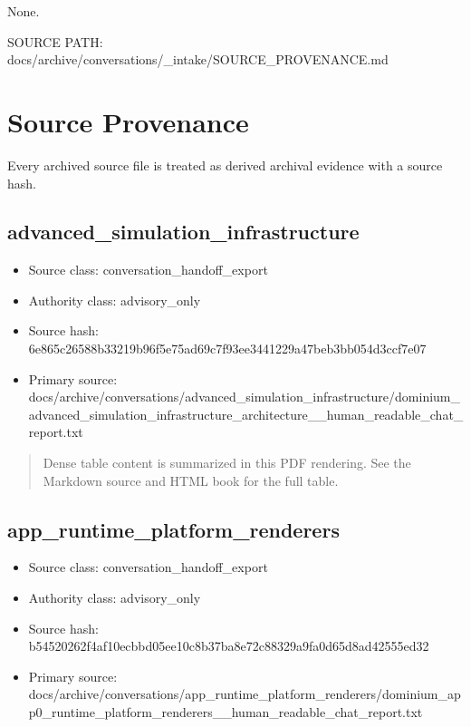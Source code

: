\documentclass[11pt,a4paper]{report}
\begin{document}
None.




{\small\raggedright SOURCE PATH: docs/\allowbreak{}archive/\allowbreak{}conversations/\allowbreak{}\_\allowbreak{}intake/\allowbreak{}SOURCE\_\allowbreak{}PROVENANCE.md\par}


\section{Source Provenance}

Every archived source file is treated as derived archival evidence with a source hash.


\subsection{advanced\_simulation\_infrastructure}

\begin{itemize}
\item Source class: conversation\_handoff\_export
\item Authority class: advisory\_only
\item Source hash: 6e865c26588b33219b96f5e75ad69c7f93ee3441229a47beb3bb054d3ccf7e07
\item Primary source: docs/archive/conversations/advanced\_simulation\_infrastructure/dominium\_advanced\_simulation\_infrastructure\_architecture\_\_human\_readable\_chat\_report.txt
\end{itemize}

\begin{quote}\small Dense table content is summarized in this PDF rendering. See the Markdown source and HTML book for the full table.\end{quote}

\subsection{app\_runtime\_platform\_renderers}

\begin{itemize}
\item Source class: conversation\_handoff\_export
\item Authority class: advisory\_only
\item Source hash: b54520262f4af10ecbbd05ee10c8b37ba8e72c88329a9fa0d65d8ad42555ed32
\item Primary source: docs/archive/conversations/app\_runtime\_platform\_renderers/dominium\_app0\_runtime\_platform\_renderers\_\_human\_readable\_chat\_report.txt
\end{itemize}
\end{document}
